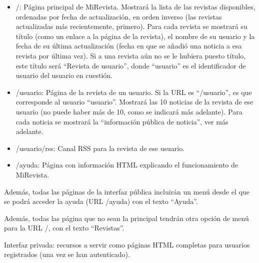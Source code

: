 \begin{itemize}
\item /: Página principal de MiRevista. Mostrará la lista de las revistas disponibles, ordenadas por fecha de actualización, en orden inverso (las revistas actualizadas más recientemente, primero). Para cada revista se mostrará su título (como un enlace a la página de la revista), el nombre de su usuario y la fecha de su última actualización (fecha en que se añadió una noticia a esa revista por última vez). Si a una revista aún no se le hubiera puesto título, este título será ``Revista de usuario'', donde ``usuario'' es el identificador de usuario del usuario en cuestión.

\item /usuario: Página de la revista de un usuario. Si la URL es ``/usuario'', es que corresponde al usuario ``usuario''. Mostrará las 10 noticias de la revista de ese usuario (no puede haber más de 10, como se indicará más adelante). Para cada noticia se mostrará la ``información pública de noticia'', ver más adelante.

\item /usuario/rss: Canal RSS para la revista de ese usuario.

\item /ayuda: Página con información HTML explicando el funcionamiento de MiRevista.
\end{itemize}

Además, todas las páginas de la interfaz pública incluirán un menú desde el que se podrá acceder la ayuda (URL /ayuda) con el texto ``Ayuda''.

Además, todas las página que no sean la principal tendrán otra opción de menú para la URL /, con el texto ``Revistas''.

Interfaz privada: recursos a servir como páginas HTML completas para usuarios registrados (una vez se han autenticado).

